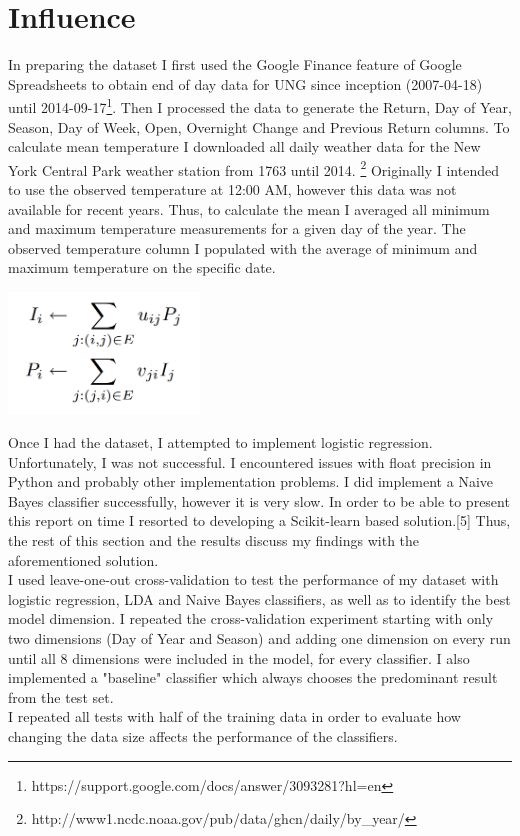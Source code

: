 \documentclass[conference,letterpaper]{IEEEtran}
\begin{document}
\section{Influence}
In preparing the dataset I first used the Google Finance feature of Google Spreadsheets to obtain end of day data for UNG
since inception (2007-04-18) until 2014-09-17\footnote{https://support.google.com/docs/answer/3093281?hl=en}. Then I processed 
the data to generate the Return, Day of Year, Season, Day of Week, Open, Overnight Change and Previous Return columns.
To calculate mean temperature I downloaded all daily weather data for the New York Central Park weather station from 1763 until 2014.
\footnote{http://www1.ncdc.noaa.gov/pub/data/ghcn/daily/by\_year/}
Originally I intended to use the observed temperature at 12:00 AM, however this data was not available for recent years.
Thus, to calculate the mean I averaged all minimum and maximum temperature measurements for a given day of the year. 
The observed temperature column I populated with the average of minimum and maximum temperature on the specific date. \\

\centerline{
  \includegraphics[width=2.0in]{influence_passivity.png}
}

\indent Once I had the dataset, I attempted to implement logistic regression. Unfortunately, I was not successful. I encountered
issues with float precision in Python and probably other implementation problems. I did implement a Naive Bayes classifier
successfully, however it is very slow.  In order to be able to present this report on time I resorted to developing 
a Scikit-learn based solution.[5] Thus, the rest of this section and the results discuss my findings with the aforementioned solution. \\
\indent I used leave-one-out cross-validation to test the performance of my dataset with logistic regression, LDA and Naive Bayes
classifiers, as well as to identify the best model dimension. I repeated the cross-validation experiment starting with only two
dimensions (Day of Year and Season) and adding one dimension on every run until all 8 dimensions were included in the model, for
every classifier. I also implemented a "baseline" classifier which always chooses the predominant result from the test set. \\
\indent I repeated all tests with half of the training data in order to evaluate how changing the data size affects the
performance of the classifiers. \\
\end{document}
